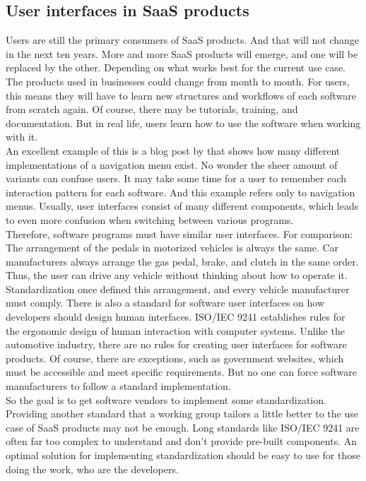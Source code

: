 \subsection{User interfaces in \ac{SaaS} products}
Users are still the primary consumers of \ac{SaaS} products. And that will not change in the next ten years. More and more SaaS products will emerge, and one will be replaced by the other. Depending on what works best for the current use case. The products used in businesses could change from month to month. For users, this means they will have to learn new structures and workflows of each software from scratch again. Of course, there may be tutorials, training, and documentation. But in real life, users learn how to use the software when working with it. \\
An excellent example of this is a blog post by \citeauthor{sernoff_website_2021} that shows how many different implementations of a navigation menu exist. No wonder the sheer amount of variants can confuse users. It may take some time for a user to remember each interaction pattern for each software. And this example refers only to navigation menus.  Usually, user interfaces consist of many different components, which leads to even more confusion when switching between various programs. \\
Therefore, software programs must have similar user interfaces. For comparison: The arrangement of the pedals in motorized vehicles is always the same. Car manufacturers always arrange the gas pedal, brake, and clutch in the same order. Thus, the user can drive any vehicle without thinking about how to operate it. Standardization once defined this arrangement, and every vehicle manufacturer must comply. There is also a standard for software user interfaces on how developers should design human interfaces.  ISO/IEC 9241 establishes rules for the ergonomic design of human interaction with computer systems. Unlike the automotive industry, there are no rules for creating user interfaces for software products. Of course, there are exceptions, such as government websites, which must be accessible and meet specific requirements. But no one can force software manufacturers to follow a standard implementation. \\
So the goal is to get software vendors to implement some standardization. Providing another standard that a working group tailors a little better to the use case of \ac{SaaS} products may not be enough. Long standards like ISO/IEC 9241 are often far too complex to understand and don't provide pre-built components. An optimal solution for implementing standardization should be easy to use for those doing the work, who are the developers. \\
